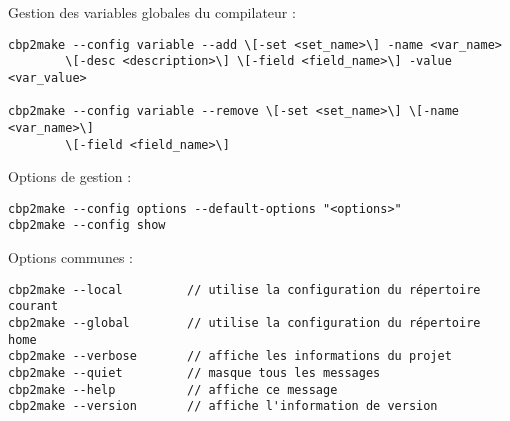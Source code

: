 \begin{samepage}
Gestion des variables globales du compilateur :
\begin{verbatim}
cbp2make --config variable --add \[-set <set_name>\] -name <var_name>
        \[-desc <description>\] \[-field <field_name>\] -value <var_value>
        
cbp2make --config variable --remove \[-set <set_name>\] \[-name <var_name>\]
        \[-field <field_name>\]
\end{verbatim}
\end{samepage}

Options de gestion :
\begin{verbatim}
cbp2make --config options --default-options "<options>"    
cbp2make --config show
\end{verbatim}

Options communes :
\begin{verbatim}
cbp2make --local         // utilise la configuration du répertoire courant
cbp2make --global        // utilise la configuration du répertoire home
cbp2make --verbose       // affiche les informations du projet
cbp2make --quiet         // masque tous les messages
cbp2make --help          // affiche ce message
cbp2make --version       // affiche l'information de version
\end{verbatim}


